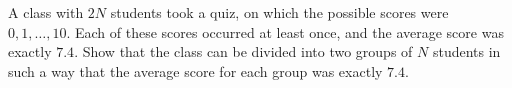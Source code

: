 A class with $2N$ students took a quiz, on which the possible scores were $0,1,\dots,10.$ Each of these scores occurred at least once, and the average score was exactly $7.4.$ Show that the class can be divided into two groups of $N$ students in such a way that the average score for each group was exactly $7.4.$